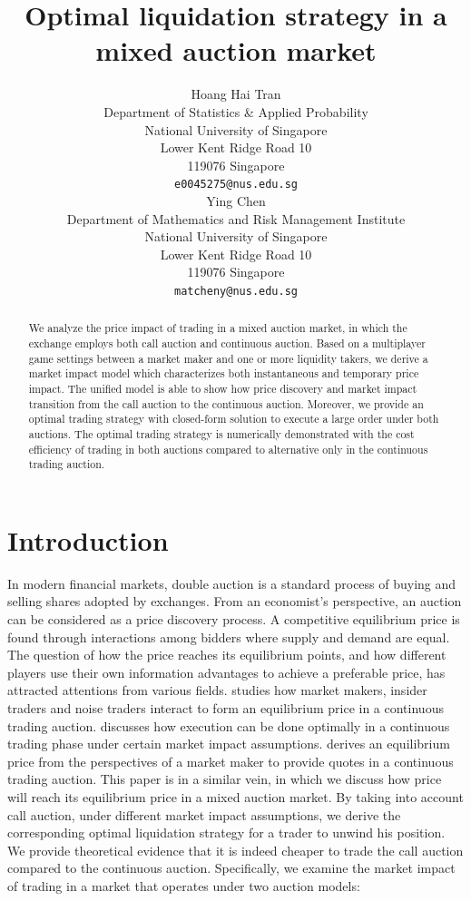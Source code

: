 \documentclass{article}
\title{Optimal liquidation strategy in a mixed auction market}
\author{
 Hoang Hai Tran\\
 Department of Statistics \& Applied Probability\\
 National University of Singapore \\
 Lower Kent Ridge Road 10 \\
 119076 Singapore \\
 \texttt{e0045275@nus.edu.sg} \\
   \And
 Ying Chen\\
 Department of Mathematics and Risk Management Institute \\
 National University of Singapore \\
 Lower Kent Ridge Road 10 \\
 119076 Singapore \\
 \texttt{matcheny@nus.edu.sg} \\
}
\begin{document}
\maketitle

\begin{abstract}
  We analyze the price impact of trading in a mixed auction market, in which the exchange employs both call auction and continuous auction. Based on a multiplayer game settings between a market maker and one or more liquidity takers, we derive a market impact model which characterizes both instantaneous and temporary price impact. The unified model is able to show how price discovery and market impact transition from the call auction to the continuous auction. Moreover, we provide an optimal trading strategy with closed-form solution to execute a large order under both auctions. The optimal trading strategy is numerically demonstrated with the cost efficiency of trading in both auctions compared to alternative only in the continuous trading auction.
\end{abstract}

\section{Introduction}
In modern financial markets, double auction is a standard process of buying and selling shares adopted by exchanges. From an economist's perspective, an auction can be considered as a price discovery process. A competitive equilibrium price is found through interactions among bidders where supply and demand are equal. The question of how the price reaches its equilibrium points, and how different players use their own information advantages to achieve a preferable price, has attracted attentions from various fields. \cite{Kyle1985} studies how market makers, insider traders and noise traders interact to form an equilibrium price in a continuous trading auction. \cite{AlmgrenChriss2000} discusses how execution can be done optimally in a continuous trading phase under certain market impact assumptions. \cite{Avellaneda2008} derives an equilibrium price from the perspectives of a market maker to provide quotes in a continuous trading auction. This paper is in a similar vein, in which we discuss how price will reach its equilibrium price in a mixed auction market. By taking into account call auction, under different market impact assumptions, we derive the corresponding optimal liquidation strategy for a trader to unwind his position. We provide theoretical evidence that it is indeed cheaper to trade the call auction compared to the continuous auction. Specifically, we examine the market impact of trading in a market that operates under two auction models:
\end{document}
